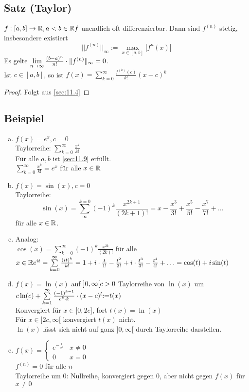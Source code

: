 \subsection{Satz (Taylor)}\label{sec:\thesubsection}
$f: [a,b] \to \mathbb{R}, a < b  \in \mathbb{R}\\
f$ unendlich oft differenzierbar. Dann sind $f^{(n)}$ stetig, insbesondere existiert
\[ ||f^{(n)}||_\infty {:=} \max_{x \in [a,b]} |f^{n}(x)| \]
Es gelte $\lim\limits_{n \to \infty} \frac{(b-a)^n}{n!}\cdot \Vert f^{(n)}\Vert_\infty = 0$.\\
Ist $c \in [a,b]$, so ist  $f(x) = \sum\limits_{k=0}^{\infty} \frac{f^{(k)}(c)}{k!}(x-c)^k$
\begin{proof}
Folgt aus \ref{sec:11.4}
\end{proof}
\subsection{Beispiel}\label{sec:\thesubsection}
\begin{enumerate}[a)]
\item $f(x) = e^x, c= 0$\\
Taylorreihe: $\sum\limits^{\infty}_{k=0} \frac{x^k}{k!}$\\
Für alle $a,b$ ist \ref{sec:11.9} erfüllt.\\
$\sum\limits^{\infty}_{k=0} \frac{x^k}{k!} = e^x$ für alle $x \in \mathbb{R}$
\item $f(x) = \sin(x), c = 0$\\
Taylorreihe:\\
\[\sin(x) = \sum\limits_{\infty}^{k=0} (-1)^k \frac{x^{2k+1}}{(2k+1)!} = x - \frac{x^3}{3!} + \frac{x^5}{5!} - \frac{x^7}{7!} + \ldots \] für alle $x \in \mathbb{R}$.
\item Analog:\\
$\cos(x) = \sum\limits^{\infty}_{k=0} (-1)^k \frac{x^{2k}}{(2k)!}$ für alle $x \in \mathbb{R}\\
e^{it} = \sum\limits^{\infty}_{k=0} \frac{(it)^k}{k!} = 1 + i \cdot \frac{t}{1!} - \frac{t^2}{2!} + i \cdot \frac{t^3}{3!} - \frac{t^4}{4!} + \ldots = \cos(t) + i \sin(t)$
\item $f(x) = \ln(x)$ auf $]0,\infty[\\
c > 0$ Taylorreihe von $\ln(x)$ um $c\\
\ln(c) + \sum\limits^{\infty}_{k=1} \frac{(-1)^{k-1}}{c^k \cdot k} \cdot (x-c)^l {:=} t(x)$\\
Konvergiert für $x \in ]0,2e]$, fort $t(x) = \ln(x)$\\
Für $x \in ]2c,\infty[$ konvergiert $t(x)$ nicht.\\
$\ln(x)$ lässt sich nicht auf ganz $]0,\infty[$ durch Taylorreihe darstellen.\\
\item $f(x) = \begin{cases}
e^{-\frac1 {x^2}}& x \ne 0\\
0 & x = 0
\end{cases}$\\
$f^{(n)} = 0 $ für alle $n$\\
Taylorreihe um $0$: Nullreihe, konvergiert gegen 0, aber nicht gegen $f(x)$ für $x \ne 0$
\end{enumerate}
\printindex


